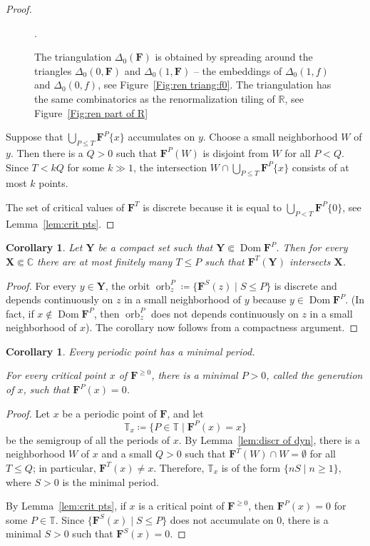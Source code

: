 \documentclass{amsart}
\newcommand{\Dom}{\operatorname {Dom}}
\newcommand{\1}{{\mathbb 1 }}
\newcommand\PT{\mathbb{ T}}
\newcommand{\bDelta}{{\mathbb{\Delta}}}
\newcommand{\bF}{{\mathbf F}}
\newcommand{\bX}{{\mathbf X}}
\newcommand{\bY}{{\mathbf Y}}
\newcommand{\C}{\mathbb{C}}
\newcommand{\R}{\mathbb{R}}
\newtheorem{cor}[thm]{Corollary}
\theoremstyle{remark}
\numberwithin{equation}{section}
\theoremstyle{definition}
\newcommand{\orb}{\operatorname{orb}}
\theoremstyle{nonumberbreak}
\begin{document}
\begin{proof}
\begin{figure}
{\begin{tikzpicture}
\end{tikzpicture}}
\caption{The triangulation $\bDelta_0(\bF)$ is obtained by spreading around the triangles $\Delta_0(0,\bF)$ and  $\Delta_0(1,\bF)$ -- the embeddings of $\Delta_0(1,f)$ and $\Delta_0(0,f)$, see Figure~\ref{Fig:ren triang:f0}.
The triangulation has the same combinatorics as the renormalization tiling of $\R$, see Figure~\ref{Fig:ren part of R}}.
\label{Fig:ren triang:bF}
\end{figure}


Suppose that $\displaystyle\bigcup_{P\le T} \bF^P\{x\}$ accumulates on $y$. Choose a small neighborhood $W$ of $y$. Then there is a $Q>0$ such that $\bF^P(W)$ is disjoint from $W$ for all $P<Q$.  Since $T< kQ$ for some $k\gg 1$, the intersection $W\cap \displaystyle \bigcup_{P\le T} \bF^P\{x\}$ consists of at most $k$ points.

The set of critical values of $\bF^T$ is discrete because it is equal to $\displaystyle\bigcup_{P<T}\bF^P\{0\}$, see Lemma~\ref{lem:crit pts}.
\end{proof}


 
\begin{cor}
\label{cor:orbit of bY}
Let $\bY$ be a compact set such that $\bY\Subset \Dom \bF^P$. Then for every $\bX\Subset \C$ there are at most finitely many $T\le P$ such that $\bF^T(\bY)$ intersects $\bX$.
\end{cor}
\begin{proof}
For every $y\in \bY$, the orbit $\orb^P_z\coloneqq \{\bF^S(z)\mid S\le P\}$ is discrete and depends continuously on $z$ in a small neighborhood of $y$ because $y\in \Dom \bF^P$. (In fact, if $x\not \in \Dom \bF^P$, then $\orb^P_z$ does not depends continuously on $z$ in a small neighborhood of $x$). The corollary now follows from a compactness argument.
\end{proof}

\begin{cor}
\label{cor:min period:per pts}
Every periodic point has a minimal period.

For every critical point $x$ of $\bF^{\ge 0}$, there is a minimal $P>0$, called the \emph{generation} of $x$, such that $\bF^P(x)=0$. 
\end{cor}
\begin{proof}
Let $x$ be a periodic point of $\bF$, and let \[\PT_x\coloneqq \big\{P\in \PT \mid \bF^P(x)=x\big\} \]
be the semigroup of all the periods of $x$. By Lemma~\ref{lem:discr of dyn}, there is a neighborhood $W$ of $x$ and a small $Q>0$ such that $\bF^T(W)\cap W=\emptyset $ for all $T\le Q$; in particular, $\bF^T(x)\not= x$. Therefore, $\PT_x$ is of the form $\{nS\mid n\ge 1\}$, where $S>0$ is the minimal period.

By Lemma~\ref{lem:crit pts}, if $x$ is a critical point of $\bF^{\ge0}$, then $\bF^P(x)=0$ for some $P\in \PT$. Since $\{\bF^S(x)\mid S\le P\}$ does not accumulate on $0$, there is a minimal $S>0$ such that $\bF^S(x)=0$.
\end{proof}
\end{document}
